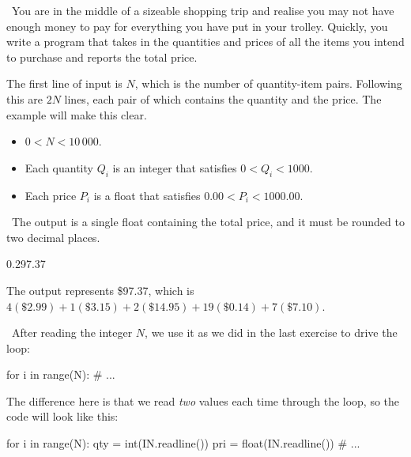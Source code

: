 
\Question\ You are in the middle of a sizeable shopping trip and realise you may not have
enough money to pay for everything you have put in your trolley. Quickly, you write a
program that takes in the quantities and prices of all the items you intend to purchase
and reports the total price.

\Input

The first line of input is $N$, which is the number of quantity-item pairs. Following this
are $2N$ lines, each pair of which contains the quantity and the price. The example will
make this clear.

\begin{itemize}
  \item $0 < N < 10\,000$.
  \item Each quantity $Q_i$ is an integer that satisfies $0 < Q_i < 1000$.
  \item Each price $P_i$ is a float that satisfies $0.00 < P_i < 1000.00$.
\end{itemize}

\Output\ The output is a single float containing the total price, and it must be rounded
to two decimal places.

\Sample

       {0.2}{97.37}

\Explanation The output represents \$97.37, which is $4(\$2.99) + 1(\$3.15) + 2(\$14.95)
+ 19(\$0.14) + 7(\$7.10)$.

\Scratch\ After reading the integer $N$, we use it as we did in the last exercise to drive
the loop:
\begin{pythoncode}
  for i in range(N):
    # ...
\end{pythoncode}

The difference here is that we read \emph{two} values each time through the loop, so the
code will look like this:
\begin{pythoncode}
  for i in range(N):
    qty = int(IN.readline())
    pri = float(IN.readline())
    # ...
\end{pythoncode}


